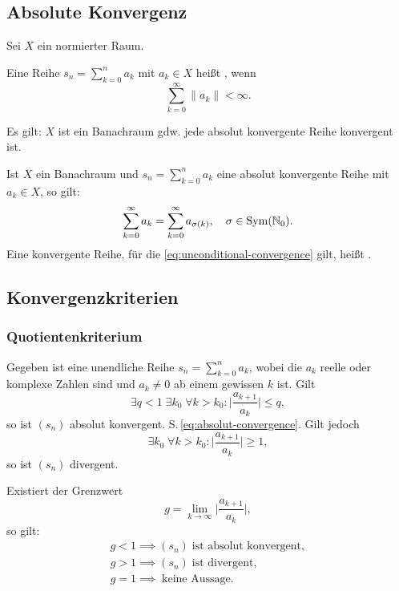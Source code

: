 \subsection{Absolute Konvergenz}
Sei $X$ ein normierter Raum.
\begin{Definition}
Eine Reihe $s_n=\sum_{k=0}^n a_k$ mit $a_k\in X$
heißt , wenn
\begin{equation}\label{eq:absolut-convergence}\textstyle
\sum_{k=0}^\infty \|a_k\| < \infty.
\end{equation}
\end{Definition}
\noindent
Es gilt: $X$ ist ein Banachraum gdw. jede absolut konvergente
Reihe konvergent ist.

Ist $X$ ein Banachraum und $s_n=\sum_{k=0}^n a_k$ eine
absolut konvergente Reihe mit $a_k\in X$, so gilt:
\begin{equation}\label{eq:unconditional-convergence}
\sum_{k=0}^\infty a_k = \sum_{k=0}^\infty a_{\sigma(k)},\quad
\sigma\in\operatorname{Sym}(\mathbb N_0).
\end{equation}
Eine konvergente Reihe, für die \eqref{eq:unconditional-convergence}
gilt, heißt .

\subsection{Konvergenzkriterien}
\subsubsection{Quotientenkriterium}
Gegeben ist eine unendliche Reihe $s_n=\sum_{k=0}^n a_k$, wobei
die $a_k$ reelle oder komplexe Zahlen sind und $a_k\ne 0$ ab einem
gewissen $k$ ist. Gilt
\begin{equation}
\exists q{<}1\;\exists k_0\;\forall k{>}k_0\colon \bigg|\frac{a_{k+1}}{a_k}\bigg|\le q,
\end{equation}
so ist $(s_n)$ absolut konvergent. S.\,\eqref{eq:absolut-convergence}.
Gilt jedoch
\begin{equation}
\exists k_0\;\forall k{>}k_0\colon\bigg|\frac{a_{k+1}}{a_k}\bigg|\ge 1,
\end{equation}
so ist $(s_n)$ divergent.

Existiert der Grenzwert
\begin{equation}
g = \lim_{k\to\infty}\bigg|\frac{a_{k+1}}{a_k}\bigg|,
\end{equation}
so gilt:
\begin{gather}
g<1\implies(s_n)\;\text{ist absolut konvergent},\\
g>1\implies(s_n)\;\text{ist divergent},\\
g=1\implies\;\text{keine Aussage}.
\end{gather}

